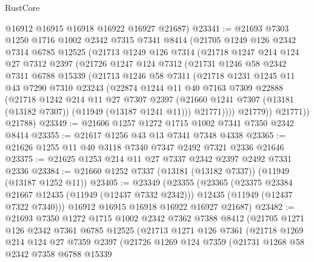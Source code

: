 \begin{lexlean}{RustCore}
\begin{coremodule}
      @16912
      @16915
      @16918
      @16922
      @16927
      @21687)
@23341 := @21693
    @7303
    @1250
    @1716
    @1002
    @2342
    @7315
    @7341
    @8414
    (@21705
      @1249
      @126
      @2342
      @7314
      @6785
      @12525
      (@21713
        @1249
        @126
        @7314
        (@21718
          @1247
          @214
          @124
          @27
          @7312
          @2397
          (@21726
            @1247
            @124
            @7312
            (@21731
              @1246
              @58
              @2342
              @7311
              @6788
              @15339
              (@21713
                @1246
                @58
                @7311
                (@21718
                  @1231
                  @1245
                  @11
                  @43
                  @7290
                  @7310
                  @23243
                  (@22874
                    @1244
                    @11
                    @40
                    @7163
                    @7309
                    @22888
                    (@21718
                      @1242
                      @214
                      @11
                      @27
                      @7307
                      @2397
                      (@21660 @1241 @7307 (@13181 (@13182 @7307)) (@11949 (@13187 @1241 @11)))
                      @21771))))
              @21779))
          @21771))
      @21788)
@23349 := @21606 @1257 @1272 @1715 @1002 @7341 @7350 @2342 @8414
@23355 := @21617 @1256 @43 @13 @7341 @7348 @4338
@23365 := @21626 @1255 @11 @40 @3118 @7340 @7347 @2492 @7321 @2336 @21646
@23375 := @21625 @1253 @214 @11 @27 @7337 @2342 @2397 @2492 @7331 @2336
@23384 := @21660 @1252 @7337 (@13181 (@13182 @7337)) (@11949 (@13187 @1252 @11))
@23405 := @23349
    (@23355
      (@23365
        (@23375 @23384 @21667 @12435 (@11949 (@12437 @7332 @2342)))
        @12435
        (@11949 (@12437 @7322 @7340)))
      @16912
      @16915
      @16918
      @16922
      @16927
      @21687)
@23482 := @21693
    @7350
    @1272
    @1715
    @1002
    @2342
    @7362
    @7388
    @8412
    (@21705
      @1271
      @126
      @2342
      @7361
      @6785
      @12525
      (@21713
        @1271
        @126
        @7361
        (@21718
          @1269
          @214
          @124
          @27
          @7359
          @2397
          (@21726
            @1269
            @124
            @7359
            (@21731
              @1268
              @58
              @2342
              @7358
              @6788
              @15339

\end{coremodule}
\end{lexlean}
